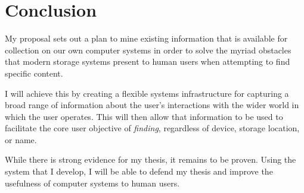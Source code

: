 \chapter{Conclusion}
\label{ch:conclusion}

\begin{quotation}
    \it{}
\end{quotation}

My proposal sets out a plan to mine existing information that is available for
collection on our own computer systems in order to solve the myriad obstacles
that modern storage systems present to human users when attempting to find
specific content.

I will achieve this by creating a flexible systems infrastructure for capturing
a broad range of information about the user's interactions with the wider world
in which the user operates.  This will then allow that information to be used to
facilitate the core user objective of \emph{finding}, regardless of device,
storage location, or name.

While there is strong evidence for my thesis, it remains to be proven.  Using
the system that I develop, I will be able to defend my thesis and improve the
usefulness of computer systems to human users.


